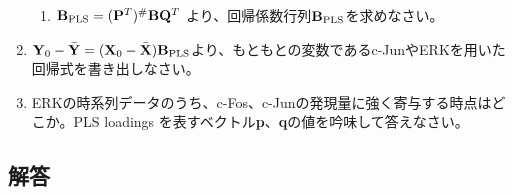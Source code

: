 \begin{enumerate}
\begin{enumerate}
\item \({\mathbf B}_{\rm PLS} = ({\mathbf P}^T)^{\#}{\mathbf B}{\mathbf Q}^T\) より、回帰係数行列\({\mathbf B}_{\rm PLS}\)を求めなさい。
\end{enumerate}
\item \({\mathbf Y}_0 - \bar{\mathbf Y} = ( {\mathbf X}_0 - \bar{\mathbf X} ){\mathbf B}_{\rm PLS}\)より、もともとの変数であるc-JunやERKを用いた回帰式を書き出しなさい。
\item ERKの時系列データのうち、c-Fos、c-Junの発現量に強く寄与する時点はどこか。PLS loadings を表すベクトル{\bf p}、{\bf q}の値を吟味して答えなさい。
\end{enumerate}

\subsection{解答}
\renewcommand{\labelenumi}{(\arabic{enumi})}
